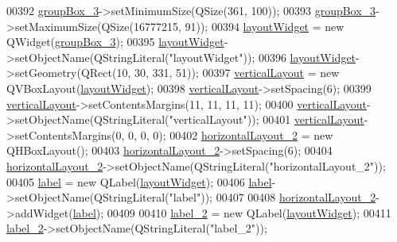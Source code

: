 \begin{DoxyCode}
00392         \hyperlink{a00027_a320d3d7ba1cb8fff7b7b95923ed10f5e}{groupBox\_3}->setMinimumSize(QSize(361, 100));
00393         \hyperlink{a00027_a320d3d7ba1cb8fff7b7b95923ed10f5e}{groupBox\_3}->setMaximumSize(QSize(16777215, 91));
00394         \hyperlink{a00027_ab96ab0f0578098521fa69a75aa5cdde8}{layoutWidget} = \textcolor{keyword}{new} QWidget(\hyperlink{a00027_a320d3d7ba1cb8fff7b7b95923ed10f5e}{groupBox\_3});
00395         \hyperlink{a00027_ab96ab0f0578098521fa69a75aa5cdde8}{layoutWidget}->setObjectName(QStringLiteral(\textcolor{stringliteral}{"layoutWidget"}));
00396         \hyperlink{a00027_ab96ab0f0578098521fa69a75aa5cdde8}{layoutWidget}->setGeometry(QRect(10, 30, 331, 51));
00397         \hyperlink{a00027_aecd96a04789fcfec3f98d80390ad8184}{verticalLayout} = \textcolor{keyword}{new} QVBoxLayout(\hyperlink{a00027_ab96ab0f0578098521fa69a75aa5cdde8}{layoutWidget});
00398         \hyperlink{a00027_aecd96a04789fcfec3f98d80390ad8184}{verticalLayout}->setSpacing(6);
00399         \hyperlink{a00027_aecd96a04789fcfec3f98d80390ad8184}{verticalLayout}->setContentsMargins(11, 11, 11, 11);
00400         \hyperlink{a00027_aecd96a04789fcfec3f98d80390ad8184}{verticalLayout}->setObjectName(QStringLiteral(\textcolor{stringliteral}{"verticalLayout"}));
00401         \hyperlink{a00027_aecd96a04789fcfec3f98d80390ad8184}{verticalLayout}->setContentsMargins(0, 0, 0, 0);
00402         \hyperlink{a00027_a80867018070156432923d0266cc9fe25}{horizontalLayout\_2} = \textcolor{keyword}{new} QHBoxLayout();
00403         \hyperlink{a00027_a80867018070156432923d0266cc9fe25}{horizontalLayout\_2}->setSpacing(6);
00404         \hyperlink{a00027_a80867018070156432923d0266cc9fe25}{horizontalLayout\_2}->setObjectName(QStringLiteral(\textcolor{stringliteral}{"horizontalLayout\_2"}));
00405         \hyperlink{a00027_ad9c89133780f28e6efa2ec17ceb9cff5}{label} = \textcolor{keyword}{new} QLabel(\hyperlink{a00027_ab96ab0f0578098521fa69a75aa5cdde8}{layoutWidget});
00406         \hyperlink{a00027_ad9c89133780f28e6efa2ec17ceb9cff5}{label}->setObjectName(QStringLiteral(\textcolor{stringliteral}{"label"}));
00407 
00408         \hyperlink{a00027_a80867018070156432923d0266cc9fe25}{horizontalLayout\_2}->addWidget(\hyperlink{a00027_ad9c89133780f28e6efa2ec17ceb9cff5}{label});
00409 
00410         \hyperlink{a00027_a2e2516d755e4dd53fc905dabddf2738a}{label\_2} = \textcolor{keyword}{new} QLabel(\hyperlink{a00027_ab96ab0f0578098521fa69a75aa5cdde8}{layoutWidget});
00411         \hyperlink{a00027_a2e2516d755e4dd53fc905dabddf2738a}{label\_2}->setObjectName(QStringLiteral(\textcolor{stringliteral}{"label\_2"}));

\end{DoxyCode}
